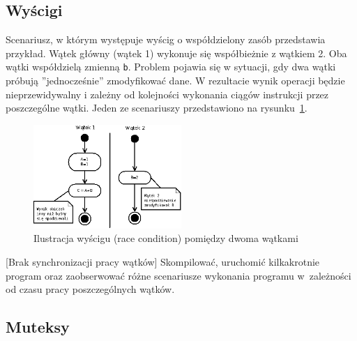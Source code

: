 \subsection{Wyścigi}

Scenariusz, w którym występuje wyścig o współdzielony zasób przedstawia przykład. Wątek główny (wątek 1) wykonuje się współbieżnie z wątkiem 2. Oba wątki współdzielą zmienną \lstinline[style=MyCStyle]{b}. Problem pojawia się w sytuacji, gdy dwa wątki próbują ''jednocześnie'' zmodyfikować dane. W rezultacie wynik operacji będzie nieprzewidywalny i zależny od kolejności wykonania ciągów instrukcji przez poszczególne wątki. Jeden ze scenariuszy przedstawiono na rysunku~\ref{fig:race}.


\begin{figure}[!h]
\centering
\includegraphics[width=0.5\textwidth]{img/thrd_race}
\caption{Ilustracja wyścigu (race condition) pomiędzy dwoma wątkami}
\label{fig:race}
\end{figure}

\begin{example}{[Brak synchronizacji pracy wątków]} \label{ex:nosynchro}
Skompilować, uruchomić kilkakrotnie program oraz zaobserwować różne scenariusze wykonania programu w~zależności od czasu pracy poszczególnych wątków.


\end{example}

\subsection{Muteksy}

